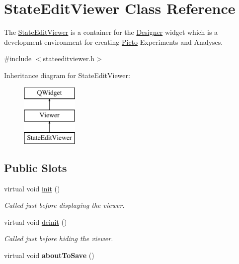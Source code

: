 \hypertarget{class_state_edit_viewer}{\section{State\-Edit\-Viewer Class Reference}
\label{class_state_edit_viewer}
}


The \hyperlink{class_state_edit_viewer}{State\-Edit\-Viewer} is a container for the \hyperlink{class_designer}{Designer} widget which is a development environment for creating \hyperlink{namespace_picto}{Picto} Experiments and Analyses.  




{\ttfamily \#include $<$stateeditviewer.\-h$>$}

Inheritance diagram for State\-Edit\-Viewer\-:\begin{figure}[H]
\begin{center}
\leavevmode
\includegraphics[height=3.000000cm]{class_state_edit_viewer}
\end{center}
\end{figure}
\subsection*{Public Slots}
\begin{DoxyCompactItemize}
\item 
virtual void \hyperlink{class_state_edit_viewer_a3f91d6f48c8765b50663ee0f99edc602}{init} ()
\begin{DoxyCompactList}\small\item\em Called just before displaying the viewer. \end{DoxyCompactList}\item 
virtual void \hyperlink{class_state_edit_viewer_a839c2ae2ce9eba0d96df26cd8ee711dd}{deinit} ()
\begin{DoxyCompactList}\small\item\em Called just before hiding the viewer. \end{DoxyCompactList}\item 
\hypertarget{class_state_edit_viewer_a34122ca6799ae1b999746fb7ad9e1289}{virtual void {\bfseries about\-To\-Save} ()}\label{class_state_edit_viewer_a34122ca6799ae1b999746fb7ad9e1289}

\end{DoxyCompactItemize}
